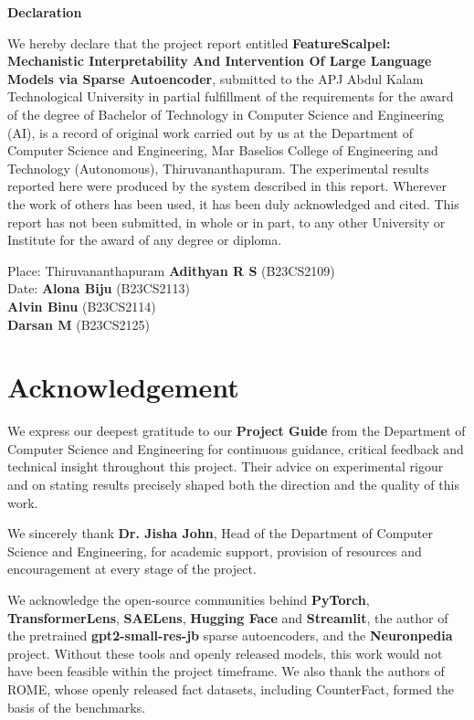 \documentclass[12pt,a4paper]{report}
\newcommand{\projecttitle}{FeatureScalpel: Mechanistic Interpretability And Intervention Of Large Language Models via Sparse Autoencoder}
\begin{document}
\thispagestyle{empty}
\begin{center}{\LARGE\bfseries Declaration\par}\end{center}
\vspace{1cm}
We hereby declare that the project report entitled \textbf{\projecttitle}, submitted to the APJ Abdul Kalam Technological University in partial fulfillment of the requirements for the award of the degree of Bachelor of Technology in Computer Science and Engineering (AI), is a record of original work carried out by us at the Department of Computer Science and Engineering, Mar Baselios College of Engineering and Technology (Autonomous), Thiruvananthapuram. The experimental results reported here were produced by the system described in this report. Wherever the work of others has been used, it has been duly acknowledged and cited. This report has not been submitted, in whole or in part, to any other University or Institute for the award of any degree or diploma.

\vspace{2.5cm}
\noindent Place: Thiruvananthapuram \hfill \textbf{Adithyan R S} (B23CS2109)\\
Date: \hfill \textbf{Alona Biju} (B23CS2113)\\
\mbox{} \hfill \textbf{Alvin Binu} (B23CS2114)\\
\mbox{} \hfill \textbf{Darsan M} (B23CS2125)
\clearpage

\setcounter{page}{1}

\chapter*{\centering Acknowledgement}
We express our deepest gratitude to our \textbf{Project Guide} from the Department of Computer Science and Engineering for continuous guidance, critical feedback and technical insight throughout this project. Their advice on experimental rigour and on stating results precisely shaped both the direction and the quality of this work.

We sincerely thank \textbf{Dr. Jisha John}, Head of the Department of Computer Science and Engineering, for academic support, provision of resources and encouragement at every stage of the project.

We acknowledge the open-source communities behind \textbf{PyTorch}, \textbf{TransformerLens}, \textbf{SAELens}, \textbf{Hugging Face} and \textbf{Streamlit}, the author of the pretrained \textbf{gpt2-small-res-jb} sparse autoencoders, and the \textbf{Neuronpedia} project. Without these tools and openly released models, this work would not have been feasible within the project timeframe. We also thank the authors of ROME, whose openly released fact datasets, including CounterFact, formed the basis of the benchmarks.
\end{document}
